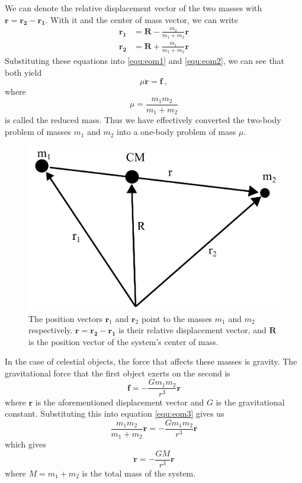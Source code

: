 \documentclass[english, oneside]{HYgradu}
\begin{document}
We can denote the relative displacement vector of the two masses with $\mathbf{r} = \mathbf{r_2} - \mathbf{r_1}$. With it and the center of mass vector, we can write
\begin{align}
\mathbf{r_1} &= \mathbf{R} - \frac{m_2}{m_1 + m_2}\mathbf{r} \\
\mathbf{r_2} &= \mathbf{R} + \frac{m_1}{m_1 + m_2}\mathbf{r}
\end{align}
Substituting these equations into \ref{equ:eom1} and \ref{equ:eom2}, we can see that both yield 
\begin{equation}
\mu \mathbf{\ddot{r}} = \mathbf{f} \ , \label{equ:eom3}
\end{equation}
where
\begin{equation}
\mu = \frac{m_1 m_2}{m_1 + m_2}
\end{equation}
is called the reduced mass. Thus we have effectively converted the two-body problem of masses $m_1$ and $m_2$ into a one-body problem of mass $\mu$.

\begin{figure}[h!tb]
\centering
\includegraphics[scale=0.5]{../images/2bp.pdf}
\caption{The position vectors $\mathbf{r}_1$ and $\mathbf{r}_2$ point to the masses $m_1$ and $m_2$ respectively. $\mathbf{r} = \mathbf{r_2} - \mathbf{r_1}$ is their relative displacement vector, and $\mathbf{R}$ is the position vector of the system's center of mass.}
\label{fig:2BodyProb}
\end{figure}

In the case of celestial objects, the force that affects these masses is gravity. The gravitational force that the first object exerts on the second is
\begin{equation}
\mathbf{f} = -\frac{G m_1 m_2}{r^3} \mathbf{r}
\end{equation}
where $\mathbf{r}$ is the aforementioned displacement vector and $G$ is the gravitational constant. Substituting this into equation \ref{equ:eom3} gives us
\begin{equation}
\frac{m_1 m_2}{m_1 + m_2} \mathbf{\ddot{r}} = -\frac{G m_1 m_2}{r^3} \mathbf{r}
\end{equation}
which gives
\begin{equation}
\mathbf{\ddot{r}} = -\frac{G M}{r^3} \mathbf{r}
\end{equation}
where $M = m_1 + m_2$ is the total mass of the system.
\end{document}
